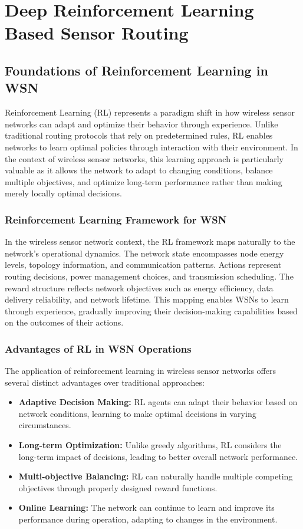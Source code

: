 \chapter{Deep Reinforcement Learning Based Sensor Routing}
\label{ch:drl_routing}

\section{Foundations of Reinforcement Learning in WSN}
Reinforcement Learning (RL) represents a paradigm shift in how wireless sensor networks can adapt and optimize their behavior through experience. Unlike traditional routing protocols that rely on predetermined rules, RL enables networks to learn optimal policies through interaction with their environment. In the context of wireless sensor networks, this learning approach is particularly valuable as it allows the network to adapt to changing conditions, balance multiple objectives, and optimize long-term performance rather than making merely locally optimal decisions.

\subsection{Reinforcement Learning Framework for WSN}
In the wireless sensor network context, the RL framework maps naturally to the network's operational dynamics. The network state encompasses node energy levels, topology information, and communication patterns. Actions represent routing decisions, power management choices, and transmission scheduling. The reward structure reflects network objectives such as energy efficiency, data delivery reliability, and network lifetime. This mapping enables WSNs to learn through experience, gradually improving their decision-making capabilities based on the outcomes of their actions.

\subsection{Advantages of RL in WSN Operations}
The application of reinforcement learning in wireless sensor networks offers several distinct advantages over traditional approaches:

\begin{itemize}
\item \textbf{Adaptive Decision Making:} RL agents can adapt their behavior based on network conditions, learning to make optimal decisions in varying circumstances.
\item \textbf{Long-term Optimization:} Unlike greedy algorithms, RL considers the long-term impact of decisions, leading to better overall network performance.
\item \textbf{Multi-objective Balancing:} RL can naturally handle multiple competing objectives through properly designed reward functions.
\item \textbf{Online Learning:} The network can continue to learn and improve its performance during operation, adapting to changes in the environment.
\end{itemize}

